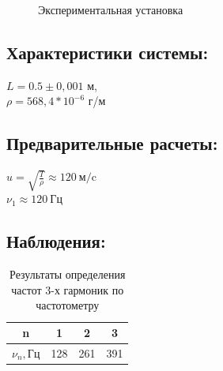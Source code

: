 \documentclass[
a4paper, %
12pt, %
]{article}
\begin{document}
	\begin{figure}[h]
		\caption{Экспериментальная установка}
		\label{experimantal}
	\end{figure}
	
	
	\subsection{Характеристики системы:}
	
	$L = 0.5\pm 0,001$ м,\\
	$\rho = 568,4 * 10^{-6}$ г/м
	
	\subsection{Предварительные расчеты:}
	
	$u = \sqrt{\frac{T}{\rho}} \approx 120 \: \text{м/c}$\\
	$\nu_1 \approx 120 \: \text{Гц}$
	
	\newpage
	
	\subsection{Наблюдения:}
	
	\begin{table}[h]
		\centering
		\begin{tabular}{|c|c|c|c|}
			\hline
			n & 1 & 2 & 3  \\
			\hline
			$\nu_n, Гц$ & 128 & 261 & 391 \\
			\hline
		\end{tabular}
		\caption{Результаты определения частот 3-х гармоник по частотометру}
	\end{table}
	
\end{document}
